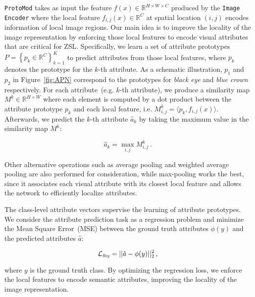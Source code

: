  \texttt{ProtoMod} takes as input the feature $f(x)\in \mathbb{R}^{H\times W \times C}$ produced by the \texttt{Image Encoder} where the local feature $f_{i,j}(x)\in \mathbb{R}^{C}$ at spatial location $(i, j)$ encodes information of local image regions. Our main idea is to improve the locality of the image representation by enforcing those local features to encode visual attributes that are critical for ZSL.
Specifically, we learn a set of attribute prototypes $P = \left \{ p_k \in \mathbb{R}^{C} \right \}_{k=1}^K$ to predict attributes from those local features, where $p_k$ denotes the prototype for the $k$-th attribute. As a schematic illustration, $p_1$ and $p_2$ in Figure~\ref{fig:APN} correspond to the prototypes for \textit{black eye} and \textit{blue crown} respectively. For each attribute~(e.g. $k$-th attribute), we produce a similarity map $M^k \in \mathbb{R}^{H\times W}$ where each element is computed by a dot product between the attribute prototype $p_k$ and each local feature, i.e. $M_{i, j}^k=\langle p_k, f_{i,j}(x)\rangle$. 
Afterwards, we predict the $k$-th attribute $\hat{a}_k$ by taking the maximum value in the similarity map $M^k$:
\begin{linenomath*}
    \begin{equation}
        \label{eq:pred_attr}
        \hat{a}_{k} = \max_{i, j} M_{i, j}^k \,.
    \end{equation}
\end{linenomath*}
Other alternative operations such as average pooling and weighted average pooling are also performed for consideration, while max-pooling works the best, since it associates each visual attribute with its closest local feature and allows the network to efficiently localize attributes.



 The class-level attribute vectors supervise the learning of attribute prototypes. We consider the attribute prediction task as a regression problem and minimize the Mean Square Error~(MSE) between the ground truth attributes $\phi(y)$ and the predicted attributes $\hat{a}$: 
\begin{linenomath*}
    \begin{equation}
    \label{eq:reg}
        \mathcal{L}_{\Scale[0.6]{Reg}} = ||\hat{a} - \phi(y) ||^2_2 \,,
    \end{equation}
\end{linenomath*}
where $y$ is the ground truth class. By optimizing the regression loss, we enforce the local features to encode semantic attributes, improving the locality of the image representation. 

